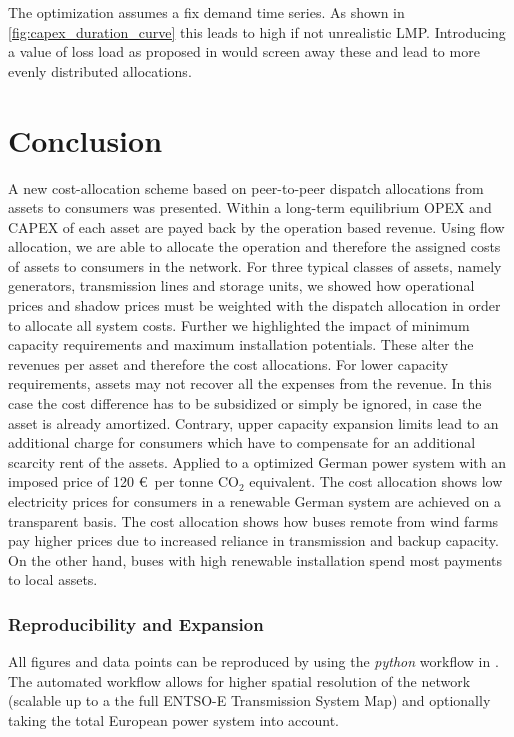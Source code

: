 \documentclass[11pt,twocolumn]{article}
\begin{document}
The optimization assumes a fix demand time series. As shown in \cref{fig:capex_duration_curve} this leads to high if not unrealistic LMP. Introducing a value of loss load as proposed in \cite{schroder_value_2015}  would screen away these and lead to more evenly distributed allocations. 


\section{Conclusion}

A new cost-allocation scheme based on peer-to-peer dispatch allocations from assets to consumers was presented. Within a long-term equilibrium OPEX and CAPEX of each asset are payed back by the operation based revenue. Using flow allocation, we are able to allocate the operation and therefore the assigned costs of assets to consumers in the network. For three typical classes of assets, namely generators, transmission lines and storage units, we showed how operational prices and shadow prices must be weighted with the dispatch allocation in order to allocate all system costs. Further we highlighted the impact of minimum capacity requirements and maximum installation potentials. These alter the revenues per asset and therefore the cost allocations. For lower capacity requirements, assets may not recover all the expenses from the revenue. In this case the cost difference has to be subsidized or simply be ignored, in case the asset is already amortized. Contrary, upper capacity expansion limits lead to an additional charge for consumers which have to compensate for an additional scarcity rent of the assets.  
Applied to a optimized German power system with an imposed price of 120 \euro\, per tonne CO$_2$ equivalent. The cost allocation shows low electricity prices for consumers in a renewable German system are achieved on a transparent basis. The cost allocation shows how buses remote from wind farms pay higher prices due to increased reliance in transmission and backup capacity. On the other hand, buses with high renewable installation spend most payments to local assets. 


\subsubsection*{Reproducibility and Expansion}

All figures and data points can be reproduced by using the \textit{python} workflow in \cite{hofmann_pypsa-costallocation_2020}. The automated workflow allows for higher spatial resolution of the network (scalable up to a the full ENTSO-E Transmission System Map) and optionally taking the total European power system into account.  
\end{document}
